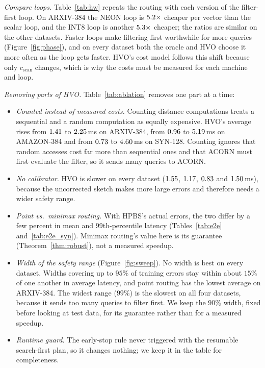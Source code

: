 \documentclass[sigconf,nonacm]{acmart}
\begin{document}
\emph{Compare loops.} Table~\ref{tab:hw} repeats the routing with each version of the filter-first loop. On ARXIV-384 the NEON loop is $5.2\times$ cheaper per vector than the scalar loop, and the INT8 loop is another $5.3\times$ cheaper; the ratios are similar on the other datasets. Faster loops make filtering first worthwhile for more queries (Figure~\ref{fig:phase}), and on every dataset both the oracle and HVO choose it more often as the loop gets faster. HVO's cost model follows this shift because only $c_{\text{scan}}$ changes, which is why the costs must be measured for each machine and loop.

\emph{Removing parts of HVO.} Table~\ref{tab:ablation} removes one part at a time:
\begin{itemize}
    \item \emph{Counted instead of measured costs.} Counting distance computations treats a sequential and a random computation as equally expensive. HVO's average rises from $1.41$ to $2.25$\,ms on ARXIV-384, from $0.96$ to $5.19$\,ms on AMAZON-384 and from $0.73$ to $4.60$\,ms on SYN-128. Counting ignores that random accesses cost far more than sequential ones and that ACORN must first evaluate the filter, so it sends many queries to ACORN.
    \item \emph{No calibrator.} HVO is slower on every dataset ($1.55$, $1.17$, $0.83$ and $1.50$\,ms), because the uncorrected sketch makes more large errors and therefore needs a wider safety range.
    \item \emph{Point vs.\ minimax routing.} With HPBS's actual errors, the two differ by a few percent in mean and 99th-percentile latency (Tables~\ref{tab:e2e} and~\ref{tab:e2e_syn}). Minimax routing's value here is its guarantee (Theorem~\ref{thm:robust}), not a measured speedup.
    \item \emph{Width of the safety range} (Figure~\ref{fig:sweep}). No width is best on every dataset. Widths covering up to $95\%$ of training errors stay within about $15\%$ of one another in average latency, and point routing has the lowest average on ARXIV-384. The widest range ($99\%$) is the slowest on all four datasets, because it sends too many queries to filter first. We keep the $90\%$ width, fixed before looking at test data, for its guarantee rather than for a measured speedup.
    \item \emph{Runtime guard.} The early-stop rule never triggered with the resumable search-first plan, so it changes nothing; we keep it in the table for completeness.
\end{itemize}
\end{document}
